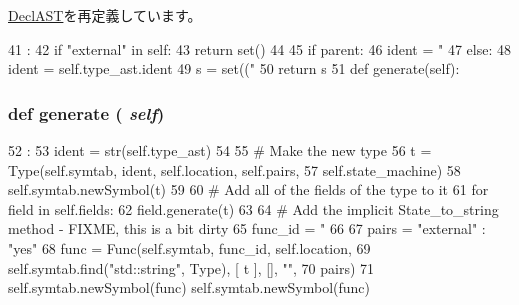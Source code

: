 \hyperlink{classslicc_1_1ast_1_1DeclAST_1_1DeclAST_a35b1a87f6fcbddeb5b793b0e415765f8}{DeclAST}を再定義しています。


\begin{DoxyCode}
41                                 :
42         if "external" in self:
43             return set()
44 
45         if parent:
46             ident = "%
47         else:
48             ident = self.type_ast.ident
49         s = set(("%
50         return s
51 
    def generate(self):
\end{DoxyCode}
\hypertarget{classslicc_1_1ast_1_1EnumDeclAST_1_1EnumDeclAST_a4555d1cee0dccf3942ea35fe86de2e8e}{
\subsubsection[{generate}]{\setlength{\rightskip}{0pt plus 5cm}def generate ( {\em self})}}
\label{classslicc_1_1ast_1_1EnumDeclAST_1_1EnumDeclAST_a4555d1cee0dccf3942ea35fe86de2e8e}



\begin{DoxyCode}
52                       :
53         ident = str(self.type_ast)
54 
55         # Make the new type
56         t = Type(self.symtab, ident, self.location, self.pairs,
57                  self.state_machine)
58         self.symtab.newSymbol(t)
59 
60         # Add all of the fields of the type to it
61         for field in self.fields:
62             field.generate(t)
63 
64         # Add the implicit State_to_string method - FIXME, this is a bit dirty
65         func_id = "%
66 
67         pairs = { "external" : "yes" }
68         func = Func(self.symtab, func_id, self.location,
69                     self.symtab.find("std::string", Type), [ t ], [], "",
70                     pairs)
71         self.symtab.newSymbol(func)
        self.symtab.newSymbol(func)
\end{DoxyCode}


